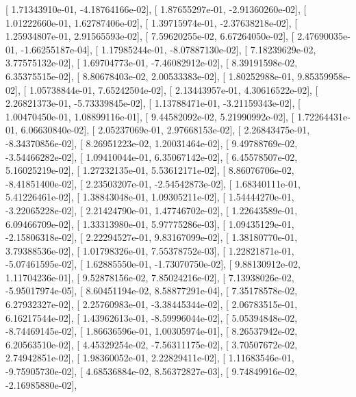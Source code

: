 \documentclass{article}
\begin{document}
       [  1.71343910e-01,  -4.18764166e-02],
       [  1.87655297e-01,  -2.91360260e-02],
       [  1.01222660e-01,   1.62787406e-02],
       [  1.39715974e-01,  -2.37638218e-02],
       [  1.25934807e-01,   2.91565593e-02],
       [  7.59620255e-02,   6.67264050e-02],
       [  2.47690035e-01,  -1.66255187e-04],
       [  1.17985244e-01,  -8.07887130e-02],
       [  7.18239629e-02,   3.77575132e-02],
       [  1.69704773e-01,  -7.46082912e-02],
       [  8.39191598e-02,   6.35375515e-02],
       [  8.80678403e-02,   2.00533383e-02],
       [  1.80252988e-01,   9.85359958e-02],
       [  1.05738844e-01,   7.65242504e-02],
       [  2.13443957e-01,   4.30616522e-02],
       [  2.26821373e-01,  -5.73339845e-02],
       [  1.13788471e-01,  -3.21159343e-02],
       [  1.00470450e-01,   1.08899116e-01],
       [  9.44582092e-02,   5.21990992e-02],
       [  1.72264431e-01,   6.06630840e-02],
       [  2.05237069e-01,   2.97668153e-02],
       [  2.26843475e-01,  -8.34370856e-02],
       [  8.26951223e-02,   1.20031464e-02],
       [  9.49788769e-02,  -3.54466282e-02],
       [  1.09410044e-01,   6.35067142e-02],
       [  6.45578507e-02,   5.16025219e-02],
       [  1.27232135e-01,   5.53612171e-02],
       [  8.86076706e-02,  -8.41851400e-02],
       [  2.23503207e-01,  -2.54542873e-02],
       [  1.68340111e-01,   5.41226461e-02],
       [  1.38843048e-01,   1.09305211e-02],
       [  1.54444270e-01,  -3.22065228e-02],
       [  2.21424790e-01,   1.47746702e-02],
       [  1.22643589e-01,   6.09466709e-02],
       [  1.33313980e-01,   5.97775286e-03],
       [  1.09435129e-01,  -2.15806318e-02],
       [  2.22294527e-01,   9.83167099e-02],
       [  1.38180770e-01,   3.79388536e-02],
       [  1.01798326e-01,   7.55378752e-03],
       [  1.22821871e-01,  -5.07461595e-02],
       [  1.62885550e-01,  -1.73070750e-02],
       [  9.88130912e-02,   1.11704236e-01],
       [  9.52878156e-02,   7.85024216e-02],
       [  7.13938026e-02,  -5.95017974e-05],
       [  8.60451194e-02,   8.58877291e-04],
       [  7.35178578e-02,   6.27932327e-02],
       [  2.25760983e-01,  -3.38445344e-02],
       [  2.06783515e-01,   6.16217544e-02],
       [  1.43962613e-01,  -8.59996044e-02],
       [  5.05394848e-02,  -8.74469145e-02],
       [  1.86636596e-01,   1.00305974e-01],
       [  8.26537942e-02,   6.20563510e-02],
       [  4.45329254e-02,  -7.56311175e-02],
       [  3.70507672e-02,   2.74942851e-02],
       [  1.98360052e-01,   2.22829411e-02],
       [  1.11683546e-01,  -9.75905730e-02],
       [  4.68536884e-02,   8.56372827e-03],
       [  9.74849916e-02,  -2.16985880e-02],
\end{document}
